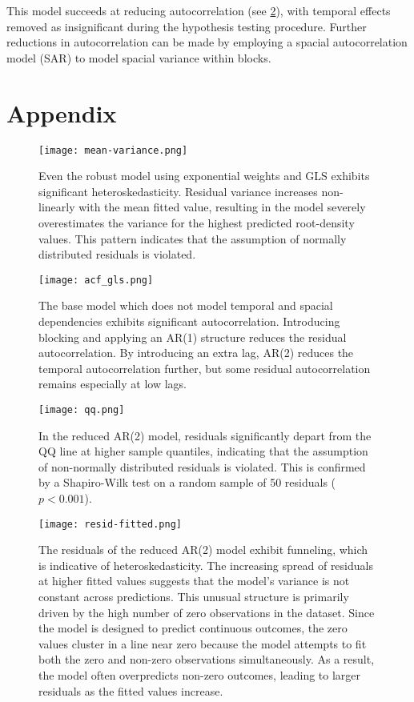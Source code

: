 \documentclass[11pt]{article}
\begin{document}
This model succeeds at reducing autocorrelation (see \ref{fig:acf_gls}), with temporal effects removed as insignificant during the hypothesis testing procedure. Further reductions in autocorrelation can be made by employing a spacial autocorrelation model (SAR) to model spacial variance within blocks.


\appendix
\section*{Appendix}

\begin{figure}[H]
    \centering
    \texttt{[image: mean-variance.png]}
    \caption{Even the robust model using exponential weights and GLS exhibits significant heteroskedasticity. Residual variance increases non-linearly with the mean fitted value, resulting in the model severely overestimates the variance for the highest predicted root-density values. This pattern indicates that the assumption of normally distributed residuals is violated.}
    \label{fig:mean_variance}
\end{figure}


\begin{figure}[H]
    \centering
    \texttt{[image: acf\_gls.png]}
    \caption{The base model which does not model temporal and spacial dependencies exhibits significant autocorrelation. Introducing blocking and applying an AR(1) structure reduces the residual autocorrelation. By introducing an extra lag, AR(2) reduces the temporal autocorrelation further, but some residual autocorrelation remains especially at low lags.}
    \label{fig:acf_gls}
\end{figure}


\begin{figure}[H]
    \centering
    \texttt{[image: qq.png]}
    \caption{In the reduced AR(2) model, residuals significantly depart from the QQ line at higher sample quantiles, indicating that the assumption of non-normally distributed residuals is violated. This is confirmed by a Shapiro-Wilk test on a random sample of 50 residuals ($p<0.001$).}
    \label{fig:qq_plot} \end{figure}

\begin{figure}[H]
    \centering
    \texttt{[image: resid-fitted.png]}
    \caption{The residuals of the reduced AR(2) model exhibit funneling, which is indicative of heteroskedasticity. The increasing spread of residuals at higher fitted values suggests that the model's variance is not constant across predictions. This unusual structure is primarily driven by the high number of zero observations in the dataset. Since the model is designed to predict continuous outcomes, the zero values cluster in a line near zero  because the model attempts to fit both the zero and non-zero observations simultaneously. As a result, the model often overpredicts non-zero outcomes, leading to larger residuals as the fitted values increase.}
    \label{fig:resid_fitted}
\end{figure}
\end{document}
